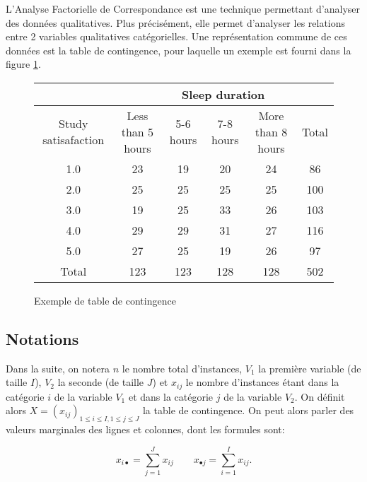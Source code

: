 L'Analyse Factorielle de Correspondance est une technique permettant d'analyser des données qualitatives. 
Plus précisément, elle permet d'analyser les relations entre 2 variables qualitatives catégorielles.
Une représentation commune de ces données est la table de contingence, pour laquelle un exemple est fourni dans la figure \ref{cont-table}. 

\begin{figure}[!h]
\begin{center}
  \begin{tabular}{| c | c | c | c | c | c |}
    \hline
    & \multicolumn{5}{|c|}{Sleep duration}\\
    \hline
    Study satisafaction & Less than 5 hours & 5-6 hours & 7-8 hours & More than 8 hours & Total\\
    \hline
    1.0 & 23 & 19 & 20 & 24 & 86 \\ 
    \hline 
    2.0 & 25 & 25 & 25 & 25 & 100\\ 
    \hline 
    3.0 & 19 & 25 & 33 & 26 & 103\\ 
    \hline 
    4.0 & 29 & 29 & 31 & 27 & 116\\ 
    \hline 
    5.0 & 27 & 25 & 19 & 26 & 97\\ 
    \hline
    Total & 123 & 123 & 128 & 128 & 502 \\ 
    \hline

  \end{tabular}
\end{center}
  \caption{Exemple de table de contingence}
  \label{cont-table}
\end{figure}

\subsection{Notations}

Dans la suite, on notera $n$ le nombre total d'instances, $V_1$ la première variable (de taille $I$), $V_2$ la seconde (de taille $J$) et $x_{ij}$ le nombre d'instances étant dans la catégorie $i$ de la variable $V_1$ et dans la catégorie $j$ de la variable $V_2$.
On définit alors $X = (x_{ij})_{1 \leq i \leq I, 1 \leq j \leq J}$ la table de contingence. On peut alors parler des valeurs marginales des lignes et colonnes, dont les formules sont:

\begin{equation}
  x_{i\bullet} = \sum_{j=1}^J x_{ij} \qquad 
  x_{\bullet j} = \sum_{i=1}^I x_{ij}.
\end{equation}

